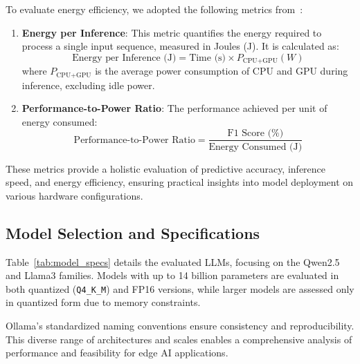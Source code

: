 \documentclass[conference]{IEEEtran}
\begin{document}
To evaluate energy efficiency, we adopted the following metrics from~\cite{hisaharo2024optimizing}:
\begin{enumerate}   
    \item \textbf{Energy per Inference}: This metric quantifies the energy required to process a single input sequence, measured in Joules (J). It is calculated as:
    \[
    \text{Energy per Inference (J)} = \text{Time (s)} \times P_{\text{CPU+GPU}} (W)
    \]
    where \( P_{\text{CPU+GPU}} \) is the average power consumption of CPU and GPU during inference, excluding idle power.
    
    \item \textbf{Performance-to-Power Ratio}: The performance achieved per unit of energy consumed:
    \[
    \text{Performance-to-Power Ratio} = \frac{\text{F1 Score (\%)}}{\text{Energy Consumed (J)}}
    \]
\end{enumerate}

These metrics provide a holistic evaluation of predictive accuracy, inference speed, and energy efficiency, ensuring practical insights into model deployment on various hardware configurations.

\subsection{Model Selection and Specifications}

Table~\ref{tab:model_specs} details the evaluated LLMs, focusing on the Qwen2.5 and Llama3 families. Models with up to 14 billion parameters are evaluated in both quantized (\texttt{Q4\_K\_M}) and FP16 versions, while larger models are assessed only in quantized form due to memory constraints.

Ollama's standardized naming conventions ensure consistency and reproducibility. This diverse range of architectures and scales enables a comprehensive analysis of performance and feasibility for edge AI applications.
\end{document}
